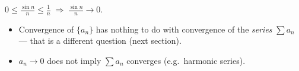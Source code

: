 \begin{example}[Squeeze]
$\displaystyle 0 \le \frac{\sin n}{n} \le \frac{1}{n} \;\Rightarrow\; \frac{\sin n}{n} \to 0.$
\end{example}

\begin{pitfallbox}
\begin{itemize}[leftmargin=*,nosep]
  \item Convergence of $\{a_n\}$ has nothing to do with convergence of the \emph{series} $\sum a_n$
        --- that is a different question (next section).
  \item $a_n \to 0$ does not imply $\sum a_n$ converges (e.g.\ harmonic series).
\end{itemize}
\end{pitfallbox}
